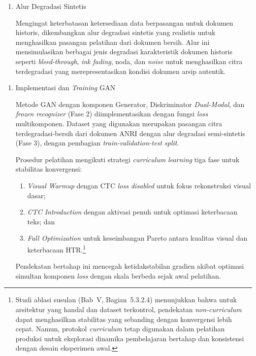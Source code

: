 \documentclass[12pt,a4paper]{article}
\begin{document}
\begin{enumerate}[label=Fase \arabic*, wide=0pt, itemsep=1em, resume]
    \item Alur Degradasi Sintetis
    
    Mengingat keterbatasan ketersediaan data berpasangan untuk dokumen historis, dikembangkan alur degradasi sintetis yang realistis untuk menghasilkan pasangan pelatihan dari dokumen bersih. Alur ini mensimulasikan berbagai jenis degradasi karakteristik dokumen historis seperti \textit{bleed-through}, \textit{ink fading}, noda, dan \textit{noise} untuk menghasilkan citra terdegradasi yang merepresentasikan kondisi dokumen arsip autentik.
\end{enumerate}

\begin{enumerate}[label=Fase \arabic*, wide=0pt, itemsep=1em, resume]
    \item Implementasi dan \textit{Training} GAN
    
    Metode GAN dengan komponen Generator, Diskriminator \textit{Dual-Modal}, dan \textit{frozen recognizer} (Fase 2) diimplementasikan dengan fungsi \textit{loss} multikomponen. Dataset yang digunakan merupakan pasangan citra terdegradasi-bersih dari dokumen ANRI dengan alur degradasi semi-sintetis (Fase 3), dengan pembagian \textit{train-validation-test split}.

    Prosedur pelatihan mengikuti strategi \textit{curriculum learning} tiga fase untuk stabilitas konvergensi:
    \begin{enumerate}[label=(\arabic*), leftmargin=*, nosep]
        \item \textit{Visual Warmup} dengan CTC \textit{loss disabled} untuk fokus rekonstruksi visual dasar;
        \item \textit{CTC Introduction} dengan aktivasi penuh untuk optimasi keterbacaan teks; dan
        \item \textit{Full Optimization} untuk keseimbangan Pareto antara kualitas visual dan keterbacaan HTR.\footnote{Studi ablasi susulan (Bab~V, Bagian~5.3.2.4) menunjukkan bahwa untuk arsitektur yang handal dan dataset terkontrol, pendekatan \textit{non-curriculum} dapat menghasilkan stabilitas yang sebanding dengan konvergensi lebih cepat. Namun, protokol \textit{curriculum} tetap digunakan dalam pelatihan produksi untuk eksplorasi dinamika pembelajaran bertahap dan konsistensi dengan desain eksperimen awal.}
    \end{enumerate}
    Pendekatan bertahap ini mencegah ketidakstabilan gradien akibat optimasi simultan komponen \textit{loss} dengan skala berbeda sejak awal pelatihan.


\end{enumerate}
\end{document}
